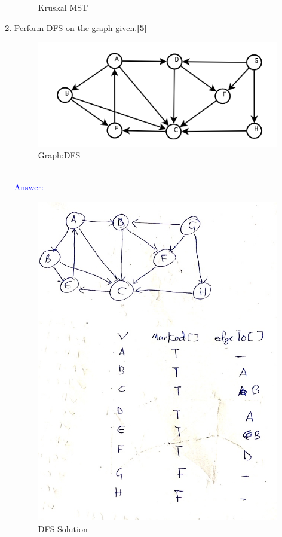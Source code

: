 \documentclass[12pt ,a4paper]{exam}
\begin{document}
\begin{enumerate}[start=1,label={\bfseries Q\arabic*)}]
\begin{figure}
    	\caption{Kruskal MST}
    	\label{fig:1609071225}
    \end{figure}
    \pagebreak
    \item Perform DFS on the graph given.\hfill\textbf{[5]} 
    \begin{figure}[h]
    	\centering
    	\includegraphics[width=0.5\linewidth]{"Screenshot 2020-12-27 at 8.15.57 PM"}
    	\caption{Graph:DFS}
    	\label{fig:screenshot-2020-12-27-at-8}
    \end{figure}\\
    \textcolor{blue}{Answer: } 
    \begin{figure}
    	\centering
    	\includegraphics[width=0.7\linewidth]{1609083854.878688}
    	\caption{DFS Solution}
    	\label{fig:1609083854}
    \end{figure}
    

	\end{enumerate}
\end{document}
